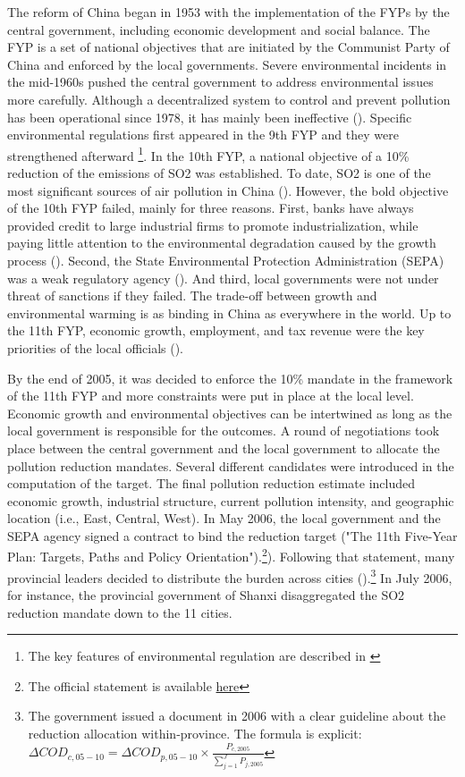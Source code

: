 \documentclass[12pt]{article}
\begin{document}
The reform of China began in 1953 with the implementation of the FYPs by the central government, including economic development and social balance. The FYP is a set of national objectives that are initiated by the Communist Party of China and enforced by the local governments. Severe environmental incidents in the mid-1960s pushed the central government to address environmental issues more carefully. Although a decentralized system to control and prevent pollution has been operational since 1978, it has mainly been ineffective (\cite{Xu2009-yw}). Specific environmental regulations first appeared in the 9th FYP and they were strengthened afterward \footnote{The key features of environmental regulation are described in \cite{Xu2011-sw}}. In the 10th FYP, a national objective of a 10\% reduction of the emissions of SO2 was established. To date, SO2 is one of the most significant sources of air pollution in China (\cite{Yan2017-le}). However, the bold objective of the 10th FYP failed, mainly for three reasons. First, banks have always provided credit to large industrial firms to promote industrialization, while paying little attention to the environmental degradation caused by the growth process (\cite{The_World_Bank2008-pn}). Second, the State Environmental Protection Administration (SEPA) was a weak regulatory agency (\cite{Stoerk2018-mx}). And third, local governments were not under threat of sanctions if they failed. The trade-off between growth and environmental warming is as binding in China as everywhere in the world. Up to the 11th FYP, economic growth, employment, and tax revenue were the key priorities of the local officials (\cite{Jiang2014-pf, Chen2018-ki}).

By the end of 2005, it was decided to enforce the 10\% mandate in the framework of the 11th FYP and more constraints were put in place at the local level. Economic growth and environmental objectives can be intertwined as long as the local government is responsible for the outcomes. A round of negotiations took place between the central government and the local government to allocate the pollution reduction mandates. Several different candidates were introduced in the computation of the target. The final pollution reduction estimate included economic growth, industrial structure, current pollution intensity, and geographic location (i.e., East, Central, West). In May 2006, the local government and the SEPA agency signed a contract to bind the reduction target ("The 11th Five-Year Plan: Targets, Paths and Policy Orientation").\footnote{The official statement is available \href{http://en.ndrc.gov.cn/newsrelease/200603/t20060323_63813.html}{here}}). Following that statement, many provincial leaders decided to distribute the burden across cities (\cite{Liu2017-ib}).\footnote{The government issued a document in 2006 with a clear guideline about the reduction allocation within-province. The formula is explicit: $\Delta C O D_{c, 05-10}=\Delta C O D_{p, 05-10} \times \frac{P_{c, 2005}}{\sum_{j=1}^{J} P_{j, 2005}}$} In July 2006, for instance, the provincial government of Shanxi disaggregated the SO2 reduction mandate down to the 11 cities.
\end{document}

